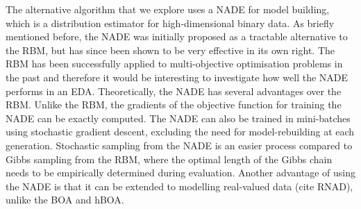 \documentclass[twoside]{article}
\begin{document}

The alternative algorithm that we explore uses a NADE for model building, which is a distribution estimator for high-dimensional binary data. As briefly mentioned before, the NADE was initially proposed as a tractable alternative to the RBM, but has since been shown to be very effective in its own right. The RBM has been successfully applied to multi-objective optimisation problems in the past and therefore it would be interesting to investigate how well the NADE performs in an EDA. Theoretically, the NADE has several advantages over the RBM. Unlike the RBM, the gradients of the objective function for training the NADE can be exactly computed. The NADE can also be trained in mini-batches using stochastic gradient descent, excluding the need for model-rebuilding at each generation. Stochastic sampling from the NADE is an easier process compared to Gibbs sampling from the RBM, where the optimal length of the Gibbs chain needs to be empirically determined during evaluation. Another advantage of using the NADE is that it can be extended to modelling real-valued data (cite RNAD), unlike the BOA and hBOA.  

\end{document}
